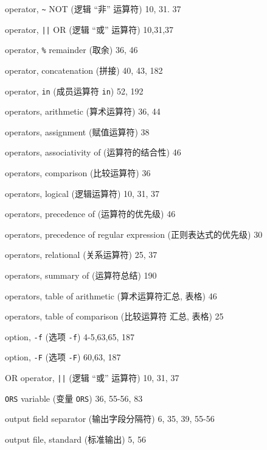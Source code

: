 \begin{multicols}{2}
\hangindent=2pc  operator, \verb'~' NOT (逻辑 ``非'' 运算符)
10, 31. 37

\hangindent=2pc  operator, \verb'||' OR (逻辑 ``或'' 运算符)
10,31,37

\hangindent=2pc  operator, \verb'%' remainder (取余) 36, 46

\hangindent=2pc  operator, concatenation (拼接) 40, 43,  182

\hangindent=2pc  operator, \verb'in' (成员运算符 \verb'in') 52, 192

\hangindent=2pc  operators, arithmetic (算术运算符) 36, 44

\hangindent=2pc  operators, assignment (赋值运算符) 38

\hangindent=2pc  operators, associativity of (运算符的结合性) 46

\hangindent=2pc  operators, comparison (比较运算符) 36

\hangindent=2pc  operators, logical (逻辑运算符) 10, 31, 37

\hangindent=2pc  operators, precedence of (运算符的优先级) 46

\hangindent=2pc  operators, precedence of regular expression
(正则表达式的优先级) 30

\hangindent=2pc  operators, relational (关系运算符) 25, 37

\hangindent=2pc  operators, summary of (运算符总结) 190

\hangindent=2pc  operators, table of arithmetic (算术运算符汇总,
表格) 46

\hangindent=2pc  operators, table of comparison (比较运算符
汇总, 表格) 25

\hangindent=2pc  option, \verb'-f' (选项 \verb'-f') 4-5,63,65, 187

\hangindent=2pc  option, \verb'-F' (选项 \verb'-F') 60,63, 187

\hangindent=2pc  OR operator, \verb'||' (逻辑 ``或'' 运算符)
10, 31, 37

\hangindent=2pc  \verb'ORS' variable (变量 \verb'ORS') 36, 55-56, 83

\hangindent=2pc  output field separator (输出字段分隔符)
6, 35, 39, 55-56

\hangindent=2pc  output file, standard (标准输出) 5, 56


\end{multicols}

